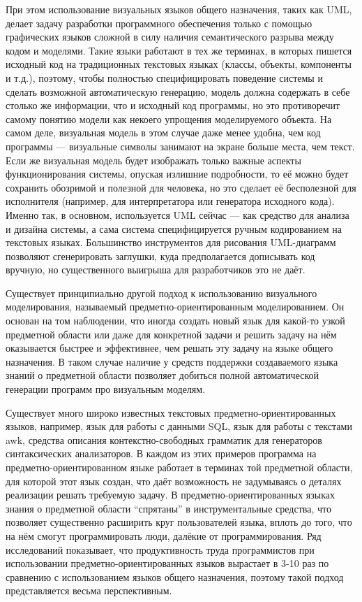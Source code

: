 При этом использование визуальных языков общего назначения, таких как UML, делает задачу 
разработки программного обеспечения только с помощью графических языков сложной
в силу наличия семантического разрыва между кодом и моделями. Такие языки работают в 
тех же терминах, в которых пишется исходный код на традиционных текстовых языках 
(классы, объекты, компоненты и т.д.), поэтому, чтобы полностью специфицировать 
поведение системы и сделать возможной автоматическую генерацию, модель должна 
содержать в себе столько же информации, что и исходный код программы, но это 
противоречит самому понятию модели как некоего упрощения моделируемого объекта. 
На самом деле, визуальная модель в этом случае даже менее удобна, чем код 
программы --- визуальные символы занимают на экране больше места, чем текст. 
Если же визуальная модель будет изображать только важные аспекты 
функционирования системы, опуская излишние подробности, то её можно будет 
сохранить обозримой и полезной для человека, но это сделает её бесполезной для 
исполнителя (например, для интерпретатора или генератора исходного кода). 
Именно так, в основном, используется UML сейчас --- как средство для анализа и 
дизайна системы, а сама система специфицируется ручным кодированием на текстовых 
языках. Большинство инструментов для рисования UML-диаграмм позволяют 
сгенерировать заглушки, куда предполагается дописывать код вручную, но 
существенного выигрыша для разработчиков это не даёт.

Существует принципиально другой подход к использованию визуального 
моделирования, называемый предметно-ориентированным моделированием. Он основан на том наблюдении, что иногда создать новый 
язык для какой-то узкой предметной области или даже для конкретной задачи и решить задачу 
на нём оказывается быстрее и эффективнее, чем решать эту задачу на языке общего назначения. 
В таком случае наличие у средств поддержки создаваемого языка знаний о предметной области 
позволяет добиться полной автоматической генерации программ про визуальным моделям.

Существует много широко известных текстовых предметно-ориентированных языков, 
например, язык для работы с данными SQL, язык для работы с текстами awk,
средства описания контекстно-свободных грамматик для генераторов синтаксических 
анализаторов. В каждом из этих примеров программа на предметно-ориентированном 
языке работает в терминах той предметной области, для которой этот язык создан,
что даёт возможность не задумываясь о деталях реализации решать требуемую 
задачу. В предметно-ориентированных языках знания о предметной области "`спрятаны"' 
в инструментальные средства, что позволяет существенно расширить круг пользователей языка, 
вплоть до того, что на нём смогут программировать люди, далёкие от программирования. Ряд исследований
показывает, что продуктивность труда программистов при использовании 
предметно-ориентированных языков вырастает в 3-10 раз по сравнению с 
использованием языков общего назначения, поэтому такой подход представляется 
весьма перспективным.

